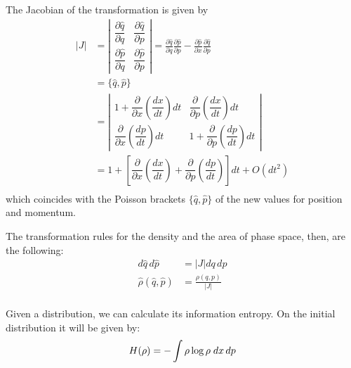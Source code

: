 \documentclass[aps,pra,10pt,twocolumn,floatfix,nofootinbib]{revtex4-1}
\begin{document}
The Jacobian of the transformation is given by
\begin{equation}
\label{Jacobian}
\begin{aligned}
	|J| &= \left| \begin{matrix}
		\dfrac{\partial \hat{q}}{\partial q} & \dfrac{\partial \hat{q}}{\partial p} \\[2.2ex]
		\dfrac{\partial \hat{p}}{\partial q} & \dfrac{\partial \hat{p}}{\partial p} \end{matrix} \right| = \frac{\partial \hat{q}}{\partial q} \frac{\partial \hat{p}}{\partial p} - \frac{\partial \hat{p}}{\partial x} \frac{\partial \hat{q}}{\partial p}\\
	&= \{\hat{q}, \hat{p}\} \\
	&= \left| \begin{matrix}
	1 + \dfrac{\partial}{\partial x} \left( \dfrac{dx}{dt} \right) dt & \dfrac{\partial}{\partial p} \left( \dfrac{dx}{dt} \right) dt \\[2.2ex]
	\dfrac{\partial}{\partial x} \left( \dfrac{dp}{dt} \right) dt & 1 + \dfrac{\partial}{\partial p} \left( \dfrac{dp}{dt} \right) dt \end{matrix} \right| \\
&= 1 + \left[ \dfrac{\partial}{\partial x} \left( \dfrac{dx}{dt} \right) + \dfrac{\partial}{\partial p} \left( \dfrac{dp}{dt} \right) \right] dt + O(dt^2)\\
\end{aligned}
\end{equation}
which coincides with the Poisson brackets $\{\hat{q}, \hat{p}\}$ of the new values for position and momentum.

The transformation rules for the density and the area of phase space, then, are the following:
\begin{equation}
\label{newDistribution}
\begin{aligned}
d\hat{q}\,d\hat{p} &= |J| dq \,dp  \\
\hat{\rho}(\hat{q}, \hat{p}) &= \frac{\rho(q, p)}{|J|}  \\
\end{aligned}
\end{equation}

Given a distribution, we can calculate its information entropy. On the initial distribution it will be given by:
\begin{equation}
\label{entropy}
H(\rho) = -\int \rho \log \rho \; dx \,dp\\
\end{equation}
\end{document}
